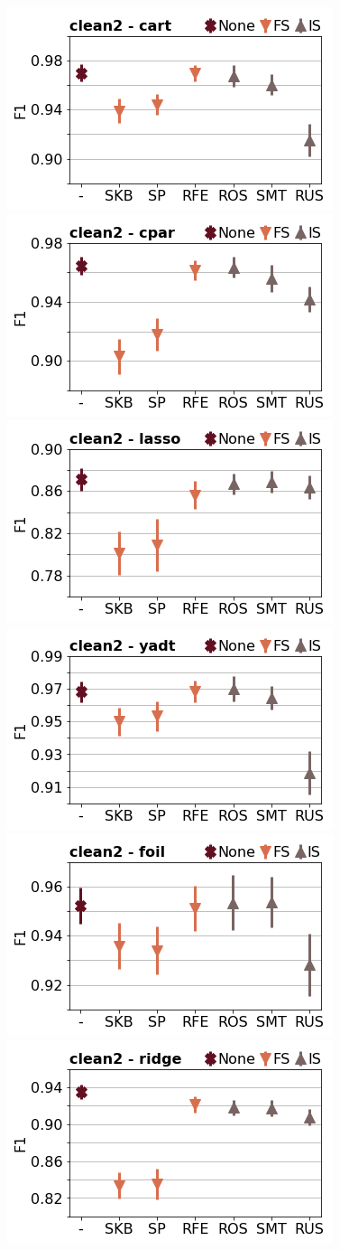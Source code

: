 \documentclass[runningheads,a4paper]{llncs}
\begin{document}
\begin{figure}[!h]
\includegraphics[width=0.32\linewidth]{fig/preps_clean2_DT_sklearn_f1score.png}
\includegraphics[width=0.32\linewidth]{fig/preps_clean2_RB_cpar_f1score.png}
\includegraphics[width=0.32\linewidth]{fig/preps_clean2_LM_lasso_f1score.png}
\includegraphics[width=0.32\linewidth]{fig/preps_clean2_DT_yadt_f1score.png}
\includegraphics[width=0.32\linewidth]{fig/preps_clean2_RB_foil_f1score.png}
\includegraphics[width=0.32\linewidth]{fig/preps_clean2_LM_ridge_f1score.png}
\end{figure}
\end{document}

